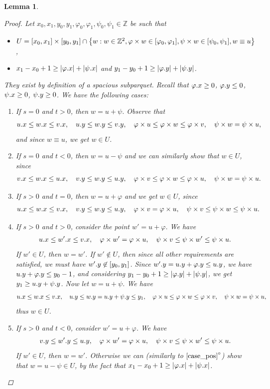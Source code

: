\documentclass[11pt]{article}
\newcommand{\Z}{\mathbb{Z}}
\renewcommand{\phi}{\varphi}
\newcommand{\set}[1]{\left\lbrace #1 \right\rbrace}
\newcommand{\eq}[1]{\begin{align*} #1 \end{align*}}
\theoremstyle{plain}
\newtheorem{lemma}{Lemma}
\theoremstyle{definition}
\theoremstyle{remark}
\begin{document}
\begin{lemma}
\begin{proof}
		Let $x_0, x_1, y_0, y_1, \phi_0, \phi_1, \psi_0, \psi_1 \in \Z$ be such that
		\begin{itemize}
			\item $ U = [x_0, x_1] \times [y_0, y_1] \cap \set{w : w \in \Z^2, \h{w} \in [\phi_0, \phi_1], \s{w} \in [\psi_0, \psi_1], w \equiv u}$,
			\item $x_1 - x_0 + 1 \ge |\x{\phi}| + |\x{\psi}|$ and $y_1 - y_0 + 1 \ge |\y{\phi}| + |\y{\psi}|$.
		\end{itemize}
		They exist by definition of a spacious subparquet.
		Recall that $\x{\phi} \ge 0$, $\y{\phi} \le 0$, $\psi.x \ge 0$, $\psi.y \ge 0$.
		We have the following cases:
		\begin{enumerate}[$1^\circ$]
			\item If $s = 0$ and $t > 0$, then $w = u + \psi$. Observe that
				\eq{
					\x{u} \le \x{w} \le \x{v}, \quad \y{u} \le \y{w} \le \y{v}, \quad \h{u} \le \h{w} \le \h{v}, \quad \s{w} = \s{u},
				}
				and since $w \equiv u$, we get $w \in U$.
			\item If $s = 0$ and $t < 0$, then $w = u - \psi$ and we can similarly show that $w \in U$, since
				\[\x{v} \le \x{w} \le \x{u}, \quad \y{v} \le \y{w} \le \y{u}, \quad \h{v} \le \h{w} \le \h{u}, \quad \s{w} = \s{u}.\]
			\item If $s > 0$ and $t = 0$, then $w = u + \phi$ and we get $w \in U$, since
				\[\x{u} \le \x{w} \le \x{v}, \quad \y{v} \le \y{w} \le \y{u}, \quad \h{v} = \h{u}, \quad \s{v} \le \s{w} \le \s{u}.\]
			\item If $s > 0$ and $t > 0$, consider the point $w' = u + \phi$. \label{case_pos}
				We have \eq{
					\x{u} \le \x{w'} \le \x{v}, \quad \h{w'} = \h{u}, \quad \s{v} \le \s{w'} \le \s{u}.
				}
				If $w' \in U$, then $w = w'$.
				If $w' \not \in U$, then since all other requirements are satisfied, we must have $w'.y \not \in [y_0, y_1]$.
				Since $\y{w'} = \y{u} + \y{\phi} \le \y{u}$, we have $\y{u} + \y{\phi} \le y_0 - 1$, and
				considering $y_1 - y_0 + 1 \ge |\y{\phi}| + |\y{\psi}|$, we get $y_1 \ge u.y + \psi.y$.
				Now let $w = u + \psi$.
				We have \eq{
					\x{u} \le \x{w} \le \x{v}, \quad \y{u} \le \y{w} = \y{u} + \y{\psi} \le y_1, \quad \h{u} \le \h{w} \le \h{v}, \quad \s{w} = \s{u},
				}
				thus $w \in U$.
			\item If $s > 0$ and $t < 0$, consider $w' = u + \phi$.
				We have \eq{
					\y{v} \le \y{w'} \le \y{u}, \quad \h{w'} = \h{u}, \quad \s{v} \le \s{w'} \le \s{u}.
				}
				If $w' \in U$, then $w = w'$.
				Otherwise we can (similarly to $\ref{case_pos}^\circ$) show that $w = u - \psi \in U$, by the fact that $x_1 - x_0 + 1 \ge |\x{\phi}| + |\x{\psi}|$. \qedhere
		\end{enumerate}
	\end{proof}
\end{lemma}
\end{document}
